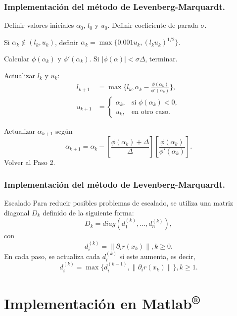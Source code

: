 \documentclass{beamer}
\newcommand{\norm}[1]{\left\lVert#1\right\rVert}
\begin{document}
\begin{frame}
    \frametitle{Implementación del método de Levenberg-Marquardt.}
    \begin{steps}
        \item Definir valores iniciales $\alpha_0$, $l_0$ y $u_0$. Definir coeficiente de parada $\sigma$.
        \item Si $\alpha_k \notin (l_k, u_k)$, definir $\alpha_k = \max \{0.001u_k, (l_ku_k)^{1/2}\}$.	
        \item Calcular $\phi(\alpha_k)$ y $\phi'(\alpha_k)$. Si $|\phi(\alpha)|<\sigma\Delta$, terminar.
        \item Actualizar $l_k$ y $u_k$:
            \begin{align*}
                l_{k+1} &= \max \{l_k, \alpha_k-\frac{\phi(\alpha_k)}{\phi'(\alpha_k)}\}, \\
                u_{k+1} &= \begin{cases}
                    \alpha_k, & \text{si } \phi(\alpha_k) < 0, \\
                    u_k, & \text{en otro caso}.
                \end{cases}
            \end{align*}
        \item Actualizar $\alpha_{k+1}$ según
        \begin{equation*}
            \alpha_{k+1} = \alpha_k - \left[\frac{\phi(\alpha_k)+\Delta}{\Delta}\right]
                            \left[\frac{\phi(\alpha_k)}{\phi'(\alpha_k)}\right].
        \end{equation*}
        Volver al Paso 2.
    \end{steps}
\end{frame}

\begin{frame}
    \frametitle{Implementación del método de Levenberg-Marquardt.}
    \begin{block}{Escalado}
        Para reducir posibles problemas de escalado, se utiliza una matriz diagonal $D_k$ definido de la siguiente forma:
        \begin{equation*}
            D_k = diag(d_1^{(k)}, \ldots, d_n^{(k)}),
        \end{equation*}
        con
        \begin{equation*}
            d_i^{(k)}=\norm{\partial_ir(x_k)}, k\geq 0.
        \end{equation*}
        En cada paso, se actualiza cada $d_i^{(k)}$ si este aumenta, es decir,
        \begin{equation*}
            d_i^{(k)} = \max \{d_i^{(k-1)}, \norm{\partial_ir(x_k)}\}, k\geq 1.
        \end{equation*}
    \end{block}
\end{frame}

\section{Implementación en Matlab\textsuperscript{®}}
\end{document}
